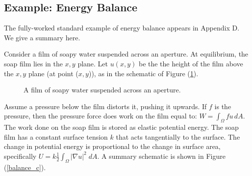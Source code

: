 \documentclass[12pt, a4paper, twoside, openright]{book}
\begin{document}
\subsection{Example: Energy Balance}

The fully-worked standard example of energy balance appears in Appendix D.  We give a summary here.

Consider a film of soapy water suspended across an aperture.  At equilibrium, the soap film lies in the $x,y$ plane.  Let $u(x,y)$ be the the height of the film above the $x,y$ plane (at point ($x,y$)), as in the schematic of Figure (\ref{soapy_c}).

\begin{figure}[ht]
\centering
{}
\caption{A film of soapy water suspended across an aperture.}\label{soapy_c}
\end{figure}

\clearpage
Assume a pressure below the film distorts it, pushing it upwards.  If $f$ is the pressure, then the pressure force does work on the film equal to: $ W = \int_{\Omega} f u \,dA $.  The work done on the soap film is stored as elastic potential energy.  The soap film has a constant surface tension $k$ that acts tangentially to the surface.  The change in potential energy is proportional to the change in surface area, specifically $ U = k \frac{1}{2} \int_{\Omega} |\nabla u|^2 \;dA $.
A summary schematic is shown in Figure (\ref{balance_c}).
\end{document}
